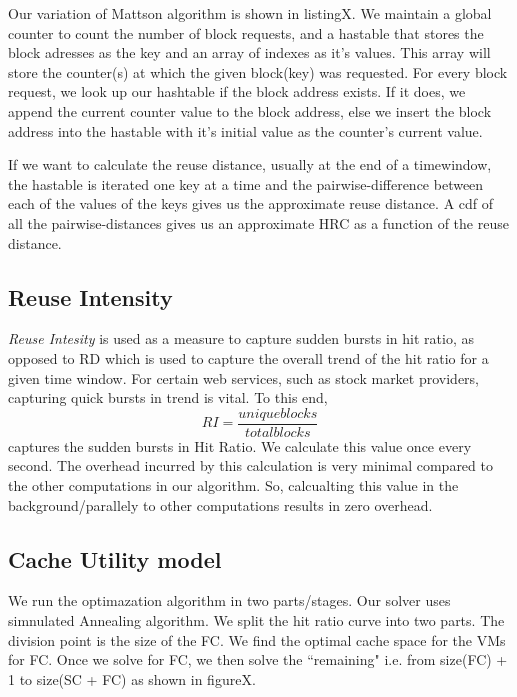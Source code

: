  Our variation of Mattson algorithm is shown in listingX. We maintain a global counter to count the number of block requests, and a hastable that stores the block adresses as the key and an array of indexes as it's values. This array will store the counter(s) at which the given block(key) was requested. For every block request, we look up our hashtable if the block address exists. If it does, we append the current counter value to the block address, else we insert the block address into the hastable with it's initial value as the counter's current value.

 If we want to calculate the reuse distance, usually at the end of a timewindow, the hastable is iterated one key at a time and the pairwise-difference between each of the values of the keys gives us the approximate reuse distance. A cdf of all the pairwise-distances gives us an approximate HRC as a function of the reuse distance. 

 \subsection{Reuse Intensity}

\emph{Reuse Intesity} is used as a measure to capture sudden bursts in hit ratio, as opposed to RD which is used to capture the overall trend of the hit ratio for a given time window. For certain web services, such as stock market providers, capturing quick bursts in trend is vital. To this end, $$ RI = \frac{unique blocks}{total blocks} $$ captures the sudden bursts in Hit Ratio. We calculate this value once every second. The overhead incurred by this calculation is very minimal compared to the other computations in our algorithm. So, calcualting this value in the background/parallely to other computations results in zero overhead. 

\subsection{Cache Utility model}


We run the optimazation algorithm in two parts/stages. Our solver uses simnulated Annealing algorithm. We split the hit ratio curve into two parts. The division point is the size of the FC. We find the optimal cache space for the VMs for FC. Once we solve for FC, we then solve the ``remaining" i.e. from size(FC) + 1 to size(SC + FC) as shown in figureX.
